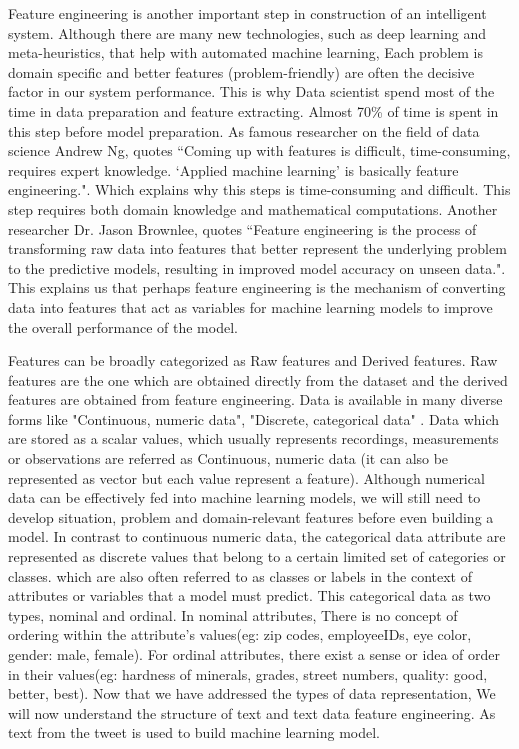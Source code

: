 Feature engineering is another important step in construction of an intelligent system. Although there are many new technologies, such as deep learning and meta-heuristics, that help with automated machine learning, Each problem is domain specific and better features (problem-friendly) are often the decisive factor in our system performance. This is why Data scientist spend most of the time in data preparation and feature extracting. Almost 70\% of time is spent in this step before model preparation. As famous researcher on the field of data science Andrew Ng, quotes ``Coming up with features is difficult, time-consuming, requires expert knowledge. `Applied machine learning' is basically feature engineering.". Which explains why this steps is time-consuming and difficult. This step requires both domain knowledge and mathematical computations. Another researcher Dr. Jason Brownlee, quotes ``Feature engineering is the process of transforming raw data into features that better represent the underlying problem to the predictive models, resulting in improved model accuracy on unseen data.". This explains us that perhaps feature engineering is the mechanism of converting data into features that act as variables for machine learning models to improve the overall performance of the model.

Features can be broadly categorized as Raw features and Derived features. Raw features are the one which are obtained directly from the dataset and the derived features are obtained from feature engineering. Data is available in many diverse forms like "Continuous, numeric data", "Discrete, categorical data" . Data which are stored as a scalar values, which usually represents recordings, measurements or observations are referred as Continuous, numeric data (it can also be represented as vector but each value represent a feature). Although numerical data can be effectively fed into machine learning models, we will still need to develop situation, problem and domain-relevant features before even building a model. In contrast to continuous numeric data, the categorical data attribute are represented as discrete values that belong to a certain limited set of categories or classes. which are also often referred to as classes or labels in the context of attributes or variables that a model must predict. This categorical data as two types, nominal and ordinal. In nominal attributes, There is no concept of ordering within the attribute's values(eg: zip codes, employeeIDs, eye color, gender: {male, female}). For ordinal attributes, there exist a sense or idea of order in their values(eg: hardness of minerals, grades, street numbers, quality: {good, better,
best}). Now that we have addressed the types of data representation, 
We will now understand the structure of text and text data feature engineering. As text from the tweet is used to build machine learning model. 


